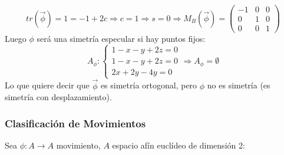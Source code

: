 \documentclass[10pt,a4paper,openright]{book}
\begin{document}
$$tr(\vec{\phi}) = 1 = -1+2c\Rightarrow c = 1 \Rightarrow s = 0 \Rightarrow  M_B(\vec{\phi})=\begin{pmatrix} -1 & 0 & 0 \\ 0 & 1 & 0 \\ 0 & 0 & 1\end{pmatrix}$$
Luego $\phi$ será una simetría especular si hay puntos fijos:
$$A_\phi : \begin{cases} 1 - x - y + 2z = 0 \\ 1-x-y+2z = 0 \\ 2x + 2y - 4y = 0 \end{cases} \Rightarrow A_\phi = \emptyset$$
Lo que quiere decir que $\vec{\phi}$ es simetría ortogonal, pero $\phi$ no es simetría (es simetría con desplazamiento).

\subsubsection*{Clasificación de Movimientos}
Sea $\phi : A \to A $ movimiento, $A$ espacio afín euclídeo de dimensión 2:
\end{document}
